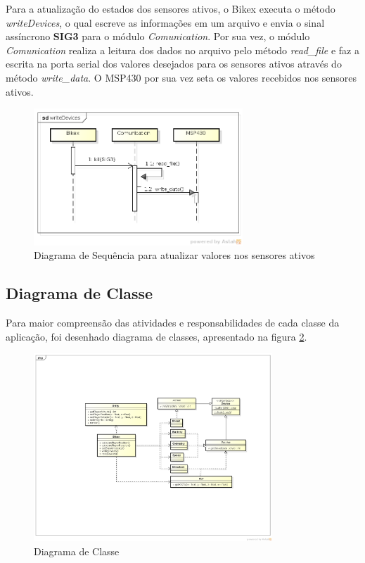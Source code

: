 Para a atualização do estados dos sensores ativos, o Bikex executa o método \textit{writeDevices}, o qual escreve as informações em um arquivo e envia o sinal assíncrono \textbf{SIG3} para o módulo \textit{Comunication}. Por sua vez, o módulo \textit{Comunication} realiza a leitura dos dados no arquivo pelo método \textit{read\_file} e  faz a escrita na porta serial dos valores desejados para os sensores ativos através do método \textit{write\_data}. O MSP430 por sua vez seta os valores recebidos nos sensores ativos.

\begin{figure}[h]
  \centering
	\includegraphics[width=0.7\textwidth]{figuras/writeDevices}
  \caption{Diagrama de Sequência para atualizar valores nos sensores ativos}
  \label{fig:diagrama-sequencia-write-devices}
\end{figure}


\subsection{Diagrama de Classe} %
\label{sec:diagrama_de_classe}

Para maior compreensão das atividades e responsabilidades de cada classe da aplicação, foi desenhado %
diagrama de classes, apresentado na figura \ref{fig:diagrama-classe}.

\begin{figure}[h]
  \centering
	\includegraphics[width=0.8\textwidth]{figuras/class_diagram}
  \caption{Diagrama de Classe}
  \label{fig:diagrama-classe}
\end{figure}

